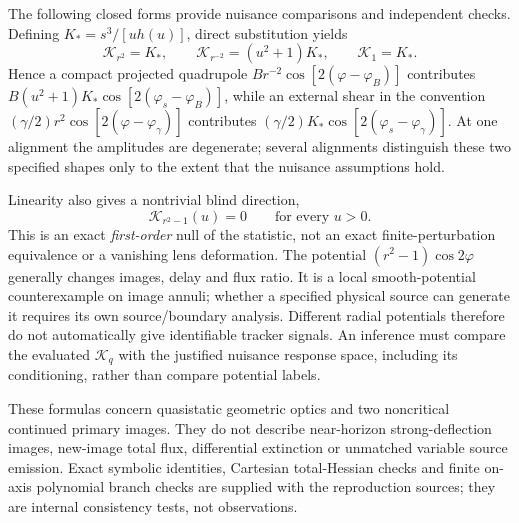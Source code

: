 The following closed forms provide nuisance comparisons and independent
checks. Defining $K_*=s^3/[u h(u)]$, direct substitution yields
\begin{equation}
 \mathcal K_{r^2}=K_*,\qquad
 \mathcal K_{r^{-2}}=(u^2+1)K_*,\qquad
 \mathcal K_1=K_*.
 \label{eq:estimator-power-responses}
\end{equation}
Hence a compact projected quadrupole
$B r^{-2}\cos[2(\varphi-\varphi_B)]$ contributes
$B(u^2+1)K_*\cos[2(\varphi_s-\varphi_B)]$, while an external shear in the
convention $(\gamma/2)r^2\cos[2(\varphi-\varphi_\gamma)]$ contributes
$(\gamma/2)K_*\cos[2(\varphi_s-\varphi_\gamma)]$. At one alignment the
amplitudes are degenerate; several alignments distinguish these two
specified shapes only to the extent that the nuisance assumptions hold.

Linearity also gives a nontrivial blind direction,
\begin{equation}
 \boxed{\mathcal K_{r^2-1}(u)=0\qquad\text{for every }u>0.}
 \label{eq:estimator-blind-direction}
\end{equation}
This is an exact \emph{first-order} null of the statistic, not an exact
finite-perturbation equivalence or a vanishing lens deformation. The potential
$(r^2-1)\cos2\varphi$ generally changes images, delay and flux ratio.
It is a local smooth-potential counterexample on image annuli; whether a
specified physical source can generate it requires its own source/boundary
analysis. Different radial potentials therefore do not automatically give
identifiable tracker signals. An inference must compare the evaluated
$\mathcal K_q$ with the justified nuisance response space, including its
conditioning, rather than compare potential labels.

These formulas concern quasistatic geometric optics and two noncritical
continued primary images. They do not describe near-horizon strong-deflection
images, new-image total flux, differential extinction or unmatched variable
source emission. Exact symbolic identities, Cartesian total-Hessian checks
and finite on-axis polynomial branch checks are supplied with the
reproduction sources; they are internal consistency tests, not observations.
